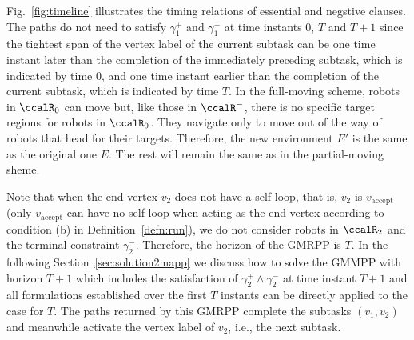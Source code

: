 \documentclass[Afour,sageh,times]{sagej}
\newcommand{\vertex}[1]{v_{\text{#1}}}
\begin{document}
{ Fig.~\ref{fig:timeline} illustrates the timing relations of essential and negstive clauses.  The paths do not need to satisfy  $\gamma_1^+$ and $\gamma_1^-$ at time instants 0,  $T$ and $ T+1$ since the tightest span of the vertex label of the current subtask can be one time instant later than the completion of the immediately preceding subtask, which is indicated by time 0, and one time instant earlier than the completion of the current subtask, which is indicated by time $T$. In the full-moving scheme, robots in $\ccalR_0$ can move but, like those in $\ccalR^-$, there is no specific target regions for robots in $\ccalR_0$. They  navigate only to move out of the way of robots that head for their targets. Therefore, the new environment $E'$ is the same as the original one $E$. The rest will remain the same as in the partial-moving sheme.

 Note that when the end vertex $v_2$ does not have a self-loop, that is, $v_2$ is $\vertex{accept}$ (only $\vertex{accept}$ can have no self-loop when acting as the end vertex according to condition (b) in Definition~\ref{defn:run}), we do not consider robots in $\ccalR_2$ and the terminal constraint $\gamma_2^-$. Therefore, the horizon of the GMRPP is $T$. In the following Section~\ref{sec:solution2mapp} we discuss how to solve the GMMPP with horizon $T+1$ which  includes the satisfaction of $\gamma_2^+\wedge \gamma_2^-$ at time instant $T+1$ and all formulations established over the first $T$ instants can be directly applied to the case for $T$.  The paths returned by this GMRPP complete the subtasks $(v_1, v_2)$  and meanwhile activate the vertex label of $v_2$, i.e., the next subtask.



}
\end{document}
